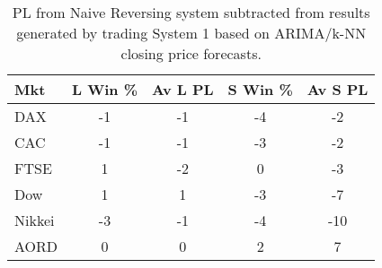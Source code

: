 \begin{table}[ht]
\centering
\caption[ARIMA/k-NN closing price system results minus Naive Reversing results]{PL from Naive Reversing system subtracted from results generated by trading System 1 based on ARIMA/k-NN closing price forecasts.} 
\label{tab:chp_ts:pred_close_arima_knn_sys1_diff}
\begin{tabular}{lcccc}
  \toprule Mkt & L Win \% & Av L PL & S Win \% & Av S PL \\ 
  \midrule DAX & -1 & -1 & -4 & -2 \\ 
  CAC & -1 & -1 & -3 & -2 \\ 
  FTSE & 1 & -2 & 0 & -3 \\ 
  Dow & 1 & 1 & -3 & -7 \\ 
  Nikkei & -3 & -1 & -4 & -10 \\ 
  AORD & 0 & 0 & 2 & 7 \\ 
   \bottomrule \end{tabular}
\end{table}
